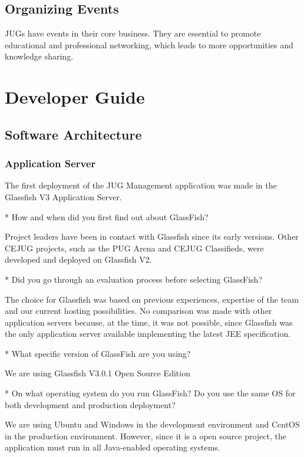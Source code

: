 \documentclass[10pt,a4paper]{report}
\begin{document}
\chapter{Organizing Events}

JUGs have events in their core business. They are essential to promote educational and professional networking, which leads to more opportunities and knowledge sharing.



\part{Developer Guide}
\chapter{Software Architecture}

\section{Application Server}
The first deployment of the JUG Management application was made in the Glassfish V3 Application Server. 

* How and when did you first find out about GlassFish?

Project leaders have been in contact with Glassfish since its early versions. Other CEJUG projects, such as the PUG Arena and CEJUG Classifieds, were developed and deployed on Glassfish V2.

* Did you go through an evaluation process before selecting GlassFish?

The choice for Glassfish was based on previous experiences, expertise of the team and our current hosting possibilities. No comparison was made with other application servers because, at the time, it was not possible, since Glassfish was the only application server available implementing the latest JEE specification.

* What specific version of GlassFish are you using?

We are using Glassfish V3.0.1 Open Source Edition

* On what operating system do you run GlassFish?  Do you use the same OS for
  both development and production deployment?
  
We are using Ubuntu and Windows in the development environment and CentOS in the production environment. However, since it is a open source project, the application must run in all Java-enabled operating systems.
\end{document}
